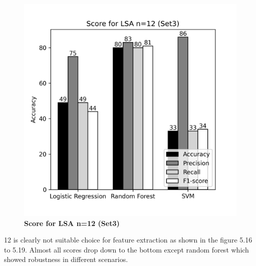 \documentclass[12pt]{report}
\begin{document}
\begin{figure}[!htb]
\begin{minipage}{0.48\textwidth}
                  \includegraphics[scale=0.55]{plots/Score for LSA n=12 (Set3).png}
                  \caption{\textbf{Score for LSA n=12 (Set3)}}\label{Fig:typo2}
                \end{minipage}
             \end{figure}
 
            12 is clearly not suitable choice for feature extraction as shown in the figure 5.16 to 5.19. Almost all scores drop down to the bottom except random forest which 
            showed robustness in different scenarios. 
\end{document}
